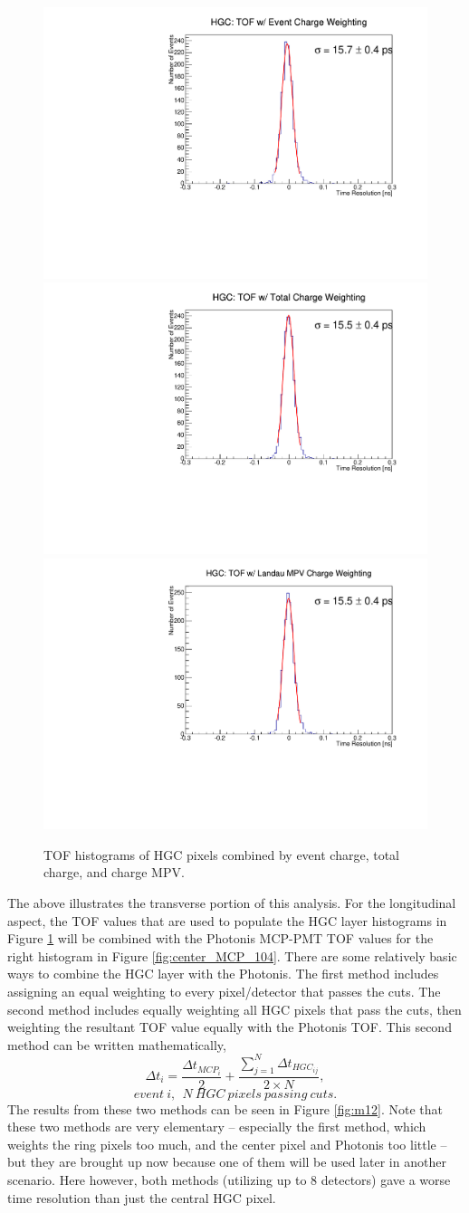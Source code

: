 \documentclass[twocolumn,aps,prd,reprint,superscriptaddress,floatfix]{revtex4-1}
\begin{document}
\begin{figure}[!htbp]
\centering
	\includegraphics[width=.32\textwidth]{deltaTPicoSilEventCharge104.pdf}
	\includegraphics[width=.32\textwidth]{deltaTPicoSilTotalCharge104.pdf}
	\includegraphics[width=.32\textwidth]{deltaTPicoSilLandauCharge104.pdf}
	\caption{TOF histograms of HGC pixels combined by event charge, total charge, and charge MPV.}
	\label{fig:HGC_event_total_MPV_104}
\end{figure}

The above illustrates the transverse portion of this analysis. 
For the longitudinal aspect, the TOF values that are used to populate the HGC layer histograms in Figure \ref{fig:HGC_event_total_MPV_104} will be combined with the Photonis MCP-PMT TOF values for the right histogram in Figure \ref{fig:center_MCP_104}.
There are some relatively basic ways to combine the HGC layer with the Photonis.
The first method includes assigning an equal weighting to every pixel/detector that passes the cuts.
The second method includes equally weighting all HGC pixels that pass the cuts, then weighting the resultant TOF value equally with the Photonis TOF.
This second method can be written mathematically,
\[
\Delta t_i = \dfrac{ \Delta t_{MCP_i} }{2} + \dfrac{\sum\limits_{j=1}^N \Delta t_{HGC_{ij}} }{2\times N},
\]
\[
event\ i,\ \ N\ HGC\ pixels\ passing\ cuts.
\]
The results from these two methods can be seen in Figure \ref{fig:m12}. 
Note that these two methods are very elementary -- especially the first method, which weights the ring pixels too much, and the center pixel and Photonis too little -- but they are brought up now because one of them will be used later in another scenario. 
Here however, both methods (utilizing up to 8 detectors) gave a worse time resolution than just the central HGC pixel.
\end{document}

